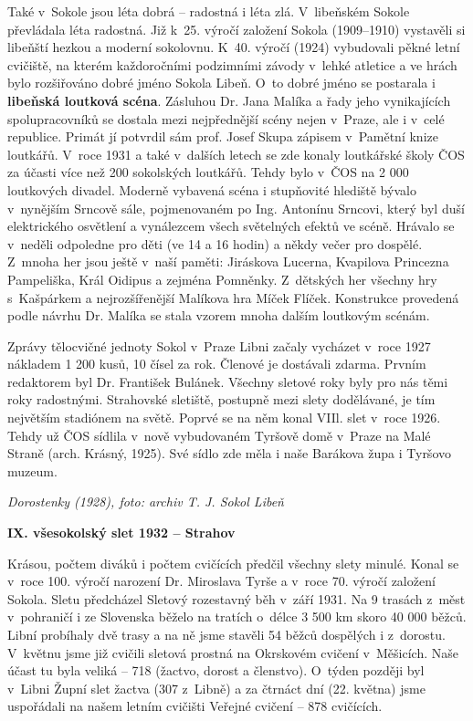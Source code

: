 \documentclass[a5paper, 12pt, twoside]{article}
\begin{document}
Také v~Sokole jsou léta dobrá --⁠⁠⁠⁠⁠⁠ radostná i léta zlá. V~libeňském Sokole
převládala léta radostná. Již k~25. výročí založení Sokola
(1909--1910) vystavěli si libeňští hezkou a moderní
sokolovnu. K~40. výročí (1924) vybudovali pěkné letní cvičiště, na
kterém každoročními podzimními závody v~lehké atletice a ve hrách bylo
rozšiřováno dobré jméno Sokola Libeň. O~to dobré jméno se postarala i
\textbf{libeňská loutková scéna}. Zásluhou Dr. Jana Malíka a řady jeho
vynikajících spolupracovníků se dostala mezi nejpřednější scény nejen
v~Praze, ale i v~celé republice. Primát jí potvrdil sám prof. Josef Skupa
zápisem v~Pamětní knize loutkářů. V~roce 1931 a také v~dalších letech se
zde konaly loutkářské školy ČOS za účasti více než 200 sokolských
loutkářů. Tehdy bylo v~ČOS na 2 000 loutkových divadel. Moderně vybavená
scéna i stupňovité hlediště bývalo v~nynějším Srncově sále, pojmenovaném
po Ing. Antonínu Srncovi, který byl duší elektrického osvětlení a
vynálezcem všech světelných efektů ve scéně. Hrávalo se v~neděli
odpoledne pro děti (ve 14 a 16 hodin) a někdy večer pro dospělé. Z~mnoha
her jsou ještě v~naší paměti: Jiráskova Lucerna, Kvapilova Princezna
Pampeliška, Král Oidipus a zejména Pomněnky. Z~dětských her všechny hry
s~Kašpárkem a nejrozšířenější Malíkova hra Míček Flíček. Konstrukce
provedená podle návrhu Dr. Malíka se stala vzorem mnoha dalším loutkovým
scénám.

Zprávy tělocvičné jednoty Sokol v~Praze Libni začaly vycházet v~roce
1927 nákladem 1 200 kusů, 10 čísel za rok. Členové je dostávali zdarma.
Prvním redaktorem byl Dr. František Bulánek. Všechny sletové roky byly
pro nás těmi roky radostnými. Strahovské sletiště, postupně mezi slety
dodělávané, je tím největším stadiónem na světě. Poprvé se na něm konal
VIIl. slet v~roce 1926. Tehdy už ČOS sídlila v~nově vybudovaném Tyršově
domě v~Praze na Malé Straně (arch. Krásný, 1925). Své sídlo zde měla i
naše Barákova župa i Tyršovo muzeum.


\textit{Dorostenky (1928), foto: archiv T. J. Sokol Libeň}

\textbf{IX. všesokolský slet 1932 -- Strahov}

Krásou, počtem diváků i počtem cvičících předčil všechny slety minulé.
Konal se v~roce 100. výročí narození Dr. Miroslava Tyrše a v~roce 70.
výročí založení Sokola. Sletu předcházel Sletový rozestavný běh v~září
1931. Na 9 trasách z~měst v~pohraničí i ze Slovenska běželo na tratích
o~délce 3 500 km skoro 40 000 běžců. Libní probíhaly dvě trasy a na ně
jsme stavěli 54 běžců dospělých i z~dorostu. V~květnu jsme již cvičili
sletová prostná na Okrskovém cvičení v~Měšicích. Naše účast tu byla
veliká -- 718 (žactvo, dorost a členstvo). O~týden později byl v~Libni
Župní slet žactva (307 z~Libně) a za čtrnáct dní (22. května) jsme
uspořádali na našem letním cvičišti Veřejné cvičení -- 878 cvičících.
\end{document}
